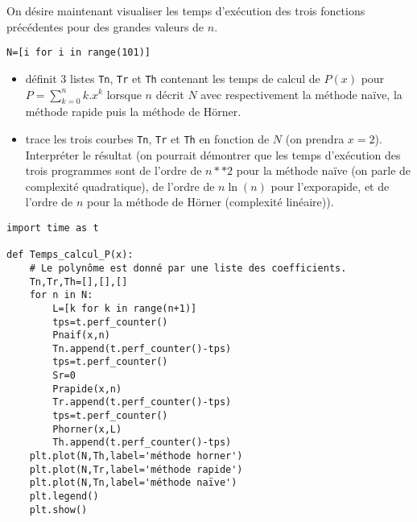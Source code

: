 \ifprof
\else
	\bigskip On désire maintenant visualiser les temps d'exécution des trois fonctions précédentes pour des grandes valeurs de $n$.
\fi

\ifprof
\begin{corrige}
\begin{lstlisting}
N=[i for i in range(101)]
\end{lstlisting}
\end{corrige}
\else
\fi
\begin{itemize}
\item définit 3 listes \lstinline{Tn}, \lstinline{Tr} et \lstinline{Th} contenant les temps de calcul de $P(x)$ pour $P=\sum_{k=0}^n k.x^k$ lorsque $n$ décrit $N$ avec respectivement la méthode naïve, la méthode rapide puis la méthode de Hörner.\\
\item trace les trois courbes  \lstinline{Tn}, \lstinline{Tr} et \lstinline{Th} en fonction de $N$ (on prendra $x=2$). Interpréter le résultat (on pourrait démontrer que les temps d'exécution des trois programmes sont de l'ordre de $n**2$ pour la méthode naïve (on parle de complexité quadratique), de l'ordre de $n\ln(n)$ pour l'exporapide, et de l'ordre de $n$ pour la méthode de Hörner (complexité linéaire)). 
\end{itemize}
\ifprof
\begin{corrige}
\begin{lstlisting}
import time as t

def Temps_calcul_P(x):
    # Le polynôme est donné par une liste des coefficients.
    Tn,Tr,Th=[],[],[]
    for n in N:
        L=[k for k in range(n+1)]
        tps=t.perf_counter()
        Pnaif(x,n)
        Tn.append(t.perf_counter()-tps)
        tps=t.perf_counter()
        Sr=0
        Prapide(x,n)
        Tr.append(t.perf_counter()-tps)
        tps=t.perf_counter()
        Phorner(x,L)
        Th.append(t.perf_counter()-tps)
    plt.plot(N,Th,label='méthode horner')
    plt.plot(N,Tr,label='méthode rapide')
    plt.plot(N,Tn,label='méthode naïve')
    plt.legend()
    plt.show()

\end{lstlisting}
\end{corrige}
\else
\fi	

